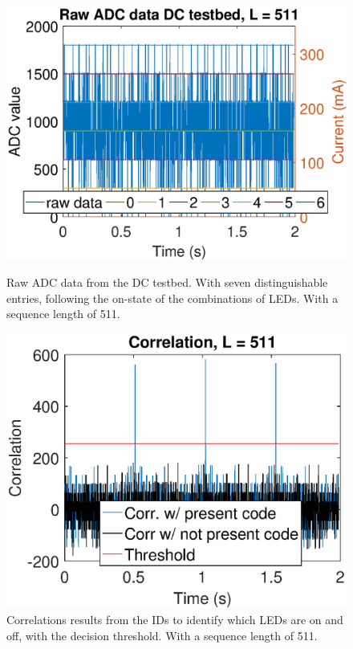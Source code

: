\begin{figure}[t]
  \centering
  \begin{minipage}[b]{0.49\textwidth}
    \includegraphics[width=\textwidth]{chapters/evaluation-chapters/hardware/dc/raw-dc-testbed-adc-data-n=9.eps}
    \caption{Raw ADC data from the DC testbed. With seven distinguishable entries, following the on-state of the combinations of LEDs. With a sequence length of 511.}
    \label{fig:raw-dc-testbed-adc-data-n=9}
  \end{minipage}
  \hfill
  \begin{minipage}[b]{0.49\textwidth}
    \includegraphics[width=\textwidth]{chapters/evaluation-chapters/hardware/dc/correlation-dc-testbed-n=9.eps}
    \caption{Correlations results from the IDs to identify which LEDs are on and off, with the decision threshold. With a sequence length of 511.}
    \label{fig:correlation-dc-testbed-n=9}
  \end{minipage}
\end{figure}


